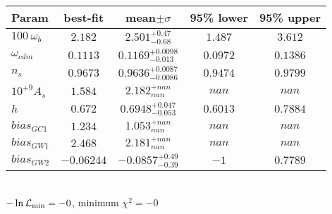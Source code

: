 \begin{tabular}{|l|c|c|c|c|} 
 \hline 
Param & best-fit & mean$\pm\sigma$ & 95\% lower & 95\% upper \\ \hline 
$100~\omega_{b }$ &$2.182$ & $2.501_{-0.68}^{+0.47}$ & $1.487$ & $3.612$ \\ 
$\omega_{cdm }$ &$0.1113$ & $0.1169_{-0.013}^{+0.0098}$ & $0.0972$ & $0.1386$ \\ 
$n_{s }$ &$0.9673$ & $0.9636_{-0.0086}^{+0.0087}$ & $0.9474$ & $0.9799$ \\ 
$10^{+9}A_{s }$ &$1.584$ & $2.182_{nan}^{+nan}$ & $nan$ & $nan$ \\ 
$h$ &$0.672$ & $0.6948_{-0.053}^{+0.047}$ & $0.6013$ & $0.7884$ \\ 
$bias_{GC 1 }$ &$1.234$ & $1.053_{nan}^{+nan}$ & $nan$ & $nan$ \\ 
$bias_{GW 1 }$ &$2.468$ & $2.181_{nan}^{+nan}$ & $nan$ & $nan$ \\ 
$bias_{GW 2 }$ &$-0.06244$ & $-0.0857_{-0.39}^{+0.49}$ & $-1$ & $0.7789$ \\ 
\hline 
 \end{tabular} \\ 
$-\ln{\cal L}_\mathrm{min} =-0$, minimum $\chi^2=-0$ \\ 
